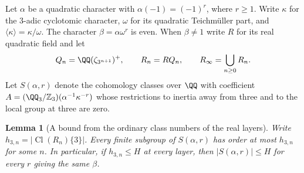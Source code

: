 \documentclass[a4paper,11pt]{article}
\newtheorem{lemma}[proposition]{Lemma}
\theoremstyle{definition}
\theoremstyle{remark}
\newcommand{\ZZ}{\mathbb Z}\newcommand{\ord}{\operatorname{ord}}
\numberwithin{equation}{section}
\newcommand{\Cl}{\operatorname{Cl}}
\begin{document}
Let \(\alpha\) be a quadratic character with
\(\alpha(-1)=(-1)^r\), where \(r\ge1\). Write \(\kappa\)
for the \(3\)-adic cyclotomic character, \(\omega\) for its
quadratic Teichm\"uller part, and \(\langle\kappa\rangle=\kappa/\omega\).
The character \(\beta=\alpha\omega^r\) is even. When \(\beta\ne1\)
write \(R\) for its real quadratic field and let
\[
  Q_n=\QQ(\zeta_{3^{n+1}})^+,\qquad R_n=RQ_n,\qquad
  R_\infty=\bigcup_{n\ge0}R_n .
\]
Let \(S(\alpha,r)\) denote the cohomology classes over \(\QQ\)
with coefficient \(A=(\QQ_3/\ZZ_3)(\alpha^{-1}\kappa^{-r})\)
whose restrictions to inertia away from three and to the local
group at three are zero.

\begin{lemma}[A bound from the ordinary class numbers of the real layers]
\leavevmode\label{lem:realorders609}
Write \(h_{3,n}=|\Cl(R_n)\{3\}|\). Every finite subgroup of
\(S(\alpha,r)\) has order at most \(h_{3,n}\) for some \(n\).
In particular, if \(h_{3,n}\le H\) at every layer, then
\(|S(\alpha,r)|\le H\) for every \(r\) giving the same \(\beta\).
\end{lemma}
\end{document}
